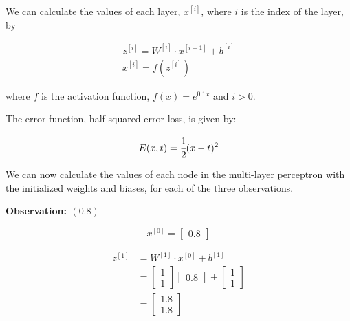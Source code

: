 \documentclass[12pt]{article}
\begin{document}
\begin{enumerate}[leftmargin=\labelsep]
          We can calculate the values of each layer, $x^{[i]}$, where $i$ is the
          index of the layer, by

          $$
              \begin{array}{c}
                  z^{[i]} = W^{[i]} \cdot x^{[i-1]} + b^{[i]} \\
                  x^{[i]} = f(z^{[i]})
              \end{array}
          $$

          where $f$ is the activation function, $f(x) = e^{0.1x}$ and $i > 0$.

          The error function, half squared error loss, is given by:

          $$
              E(x, t) = \cfrac{1}{2}(x - t)^2
          $$

          \vspace*{0.5cm}

          We can now calculate the values of each node in the multi-layer perceptron
          with the initialized weights and biases, for each of the three observations.

          \vspace*{0.5cm}

          \begin{paracol}{3}
              \begin{center}
                  \textbf{Observation: $(0.8)$}
              \end{center}

              $$
                  x^{[0]} = \begin{bmatrix}
                      0.8
                  \end{bmatrix}
              $$

              $$
                  \begin{aligned}
                      z^{[1]} & = W^{[1]} \cdot x^{[0]} + b^{[1]} \\
                              & = \begin{bmatrix}
                                      1 \\
                                      1
                                  \end{bmatrix}
                      \begin{bmatrix}
                          0.8
                      \end{bmatrix}
                      +
                      \begin{bmatrix}
                          1 \\
                          1
                      \end{bmatrix}                              \\
                              & = \begin{bmatrix}{}
                                      1.8 \\
                                      1.8
                                  \end{bmatrix}
                  \end{aligned}
              $$


\end{paracol}
\end{enumerate}
\end{document}
